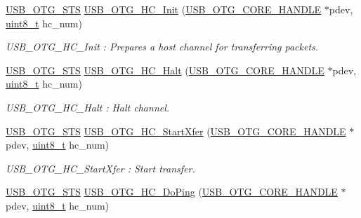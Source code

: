 \begin{DoxyCompactItemize}
\hyperlink{group___u_s_b___c_o_r_e___exported___types_ga8b6504b9af0662f17515795db0f9c8ed}{U\-S\-B\-\_\-\-O\-T\-G\-\_\-\-S\-T\-S} \hyperlink{group___u_s_b___c_o_r_e___exported___functions_prototype_gadea62a86c9f17212910379954f695d00}{U\-S\-B\-\_\-\-O\-T\-G\-\_\-\-H\-C\-\_\-\-Init} (\hyperlink{group___u_s_b___c_o_r_e___exported___types_gaf76054c11eb8a3367907aad7ae700e80}{U\-S\-B\-\_\-\-O\-T\-G\-\_\-\-C\-O\-R\-E\-\_\-\-H\-A\-N\-D\-L\-E} $\ast$pdev, \hyperlink{stdint_8h_aba7bc1797add20fe3efdf37ced1182c5}{uint8\-\_\-t} hc\-\_\-num)
\begin{DoxyCompactList}\small\item\em U\-S\-B\-\_\-\-O\-T\-G\-\_\-\-H\-C\-\_\-\-Init \-: Prepares a host channel for transferring packets. \end{DoxyCompactList}\item 
\hyperlink{group___u_s_b___c_o_r_e___exported___types_ga8b6504b9af0662f17515795db0f9c8ed}{U\-S\-B\-\_\-\-O\-T\-G\-\_\-\-S\-T\-S} \hyperlink{group___u_s_b___c_o_r_e___exported___functions_prototype_ga209900078bb880f30e632fc73dec0271}{U\-S\-B\-\_\-\-O\-T\-G\-\_\-\-H\-C\-\_\-\-Halt} (\hyperlink{group___u_s_b___c_o_r_e___exported___types_gaf76054c11eb8a3367907aad7ae700e80}{U\-S\-B\-\_\-\-O\-T\-G\-\_\-\-C\-O\-R\-E\-\_\-\-H\-A\-N\-D\-L\-E} $\ast$pdev, \hyperlink{stdint_8h_aba7bc1797add20fe3efdf37ced1182c5}{uint8\-\_\-t} hc\-\_\-num)
\begin{DoxyCompactList}\small\item\em U\-S\-B\-\_\-\-O\-T\-G\-\_\-\-H\-C\-\_\-\-Halt \-: Halt channel. \end{DoxyCompactList}\item 
\hyperlink{group___u_s_b___c_o_r_e___exported___types_ga8b6504b9af0662f17515795db0f9c8ed}{U\-S\-B\-\_\-\-O\-T\-G\-\_\-\-S\-T\-S} \hyperlink{group___u_s_b___c_o_r_e___exported___functions_prototype_ga88809efa1de4090dc8938c4fb4cff88e}{U\-S\-B\-\_\-\-O\-T\-G\-\_\-\-H\-C\-\_\-\-Start\-Xfer} (\hyperlink{group___u_s_b___c_o_r_e___exported___types_gaf76054c11eb8a3367907aad7ae700e80}{U\-S\-B\-\_\-\-O\-T\-G\-\_\-\-C\-O\-R\-E\-\_\-\-H\-A\-N\-D\-L\-E} $\ast$pdev, \hyperlink{stdint_8h_aba7bc1797add20fe3efdf37ced1182c5}{uint8\-\_\-t} hc\-\_\-num)
\begin{DoxyCompactList}\small\item\em U\-S\-B\-\_\-\-O\-T\-G\-\_\-\-H\-C\-\_\-\-Start\-Xfer \-: Start transfer. \end{DoxyCompactList}\item 
\hyperlink{group___u_s_b___c_o_r_e___exported___types_ga8b6504b9af0662f17515795db0f9c8ed}{U\-S\-B\-\_\-\-O\-T\-G\-\_\-\-S\-T\-S} \hyperlink{group___u_s_b___c_o_r_e___exported___functions_prototype_ga85c73d3fb8098abd44c7e533afe27dba}{U\-S\-B\-\_\-\-O\-T\-G\-\_\-\-H\-C\-\_\-\-Do\-Ping} (\hyperlink{group___u_s_b___c_o_r_e___exported___types_gaf76054c11eb8a3367907aad7ae700e80}{U\-S\-B\-\_\-\-O\-T\-G\-\_\-\-C\-O\-R\-E\-\_\-\-H\-A\-N\-D\-L\-E} $\ast$pdev, \hyperlink{stdint_8h_aba7bc1797add20fe3efdf37ced1182c5}{uint8\-\_\-t} hc\-\_\-num)

\end{DoxyCompactItemize}
